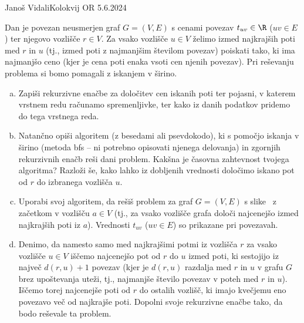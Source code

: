 \begin{naloga}{Janoš Vidali}{Kolokvij OR 5.6.2024}
\begin{vprasanje}
Dan je povezan neusmerjen graf $G = (V, E)$
s cenami povezav $t_{uv} \in \R$ ($uv \in E$)
ter njegovo vozlišče $r \in V$.
Za vsako vozlišče $u \in V$ želimo izmed najkrajših poti med $r$ in $u$
(tj., izmed poti z najmanjšim številom povezav)
poiskati tako, ki ima najmanjšo ceno
(kjer je cena poti enaka vsoti cen njenih povezav).
Pri reševanju problema si bomo pomagali z iskanjem v širino.

\begin{enumerate}[(a)]
\item Zapiši rekurzivne enačbe za določitev cen iskanih poti ter pojasni,
v katerem vrst\-nem redu računamo spremenljivke,
ter kako iz danih podatkov pridemo do tega vrstnega reda.

\item Natančno opiši algoritem (z besedami ali psevdokodo),
ki s pomočjo iskanja v širino
(metoda {\sc bfs} -- ni potrebno opisovati njenega delovanja)
in zgornjih rekurzivnih enačb reši dani problem.
Kakšna je časovna zahtevnost tvojega algoritma?
Razloži še, kako lahko iz dobljenih vrednosti
določimo iskano pot od $r$ do izbranega vozlišča $u$.

\item Uporabi svoj algoritem,
da rešiš problem za graf $G = (V, E)$ s slike~\fig
z začetkom v vozlišču $a \in V$
(tj., za vsako vozlišče grafa določi najcenejšo izmed najkrajših poti iz $a$).
Vrednosti $t_{uv}$ ($uv \in E$) so prikazane pri povezavah.

\item Denimo,
da namesto samo med najkrajšimi potmi iz vozlišča $r$
za vsako vozlišče $u \in V$ iščemo najcenejšo pot od $r$ do $u$ izmed poti,
ki sestojijo iz največ $d(r, u) + 1$ povezav
(kjer je $d(r, u)$ razdalja med $r$ in $u$ v grafu $G$ brez upoštevanja uteži,
tj., najmanjše število povezav v poteh med $r$ in $u$).
Iščemo torej najcenejše poti od $r$ do ostalih vozlišč,
ki imajo kvečjemu eno povezavo več od najkrajše poti.
Dopolni svoje rekurzivne enačbe tako, da bodo reševale ta problem.
\end{enumerate}
%
\begin{slika}
\pgfslika
{}
\end{slika}
\end{vprasanje}


\end{naloga}
